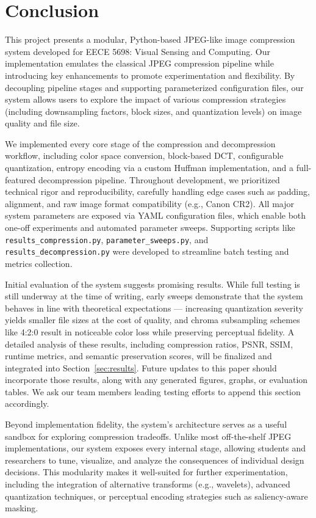 \section{Conclusion}
\label{sec:conclusion}

This project presents a modular, Python-based JPEG-like image compression system developed for EECE 5698: Visual Sensing and Computing. Our implementation emulates the classical JPEG compression pipeline while introducing key enhancements to promote experimentation and flexibility. By decoupling pipeline stages and supporting parameterized configuration files, our system allows users to explore the impact of various compression strategies (including downsampling factors, block sizes, and quantization levels) on image quality and file size.

We implemented every core stage of the compression and decompression workflow, including color space conversion, block-based DCT, configurable quantization, entropy encoding via a custom Huffman implementation, and a full-featured decompression pipeline. Throughout development, we prioritized technical rigor and reproducibility, carefully handling edge cases such as padding, alignment, and raw image format compatibility (e.g., Canon CR2). All major system parameters are exposed via YAML configuration files, which enable both one-off experiments and automated parameter sweeps. Supporting scripts like \texttt{results\_compression.py}, \texttt{parameter\_sweeps.py}, and \texttt{results\_decompression.py} were developed to streamline batch testing and metrics collection.

Initial evaluation of the system suggests promising results. While full testing is still underway at the time of writing, early sweeps demonstrate that the system behaves in line with theoretical expectations — increasing quantization severity yields smaller file sizes at the cost of quality, and chroma subsampling schemes like 4:2:0 result in noticeable color loss while preserving perceptual fidelity. A detailed analysis of these results, including compression ratios, PSNR, SSIM, runtime metrics, and semantic preservation scores, will be finalized and integrated into Section~\ref{sec:results}. Future updates to this paper should incorporate those results, along with any generated figures, graphs, or evaluation tables. We ask our team members leading testing efforts to append this section accordingly.

Beyond implementation fidelity, the system’s architecture serves as a useful sandbox for exploring compression tradeoffs. Unlike most off-the-shelf JPEG implementations, our system exposes every internal stage, allowing students and researchers to tune, visualize, and analyze the consequences of individual design decisions. This modularity makes it well-suited for further experimentation, including the integration of alternative transforms (e.g., wavelets), advanced quantization techniques, or perceptual encoding strategies such as saliency-aware masking.


